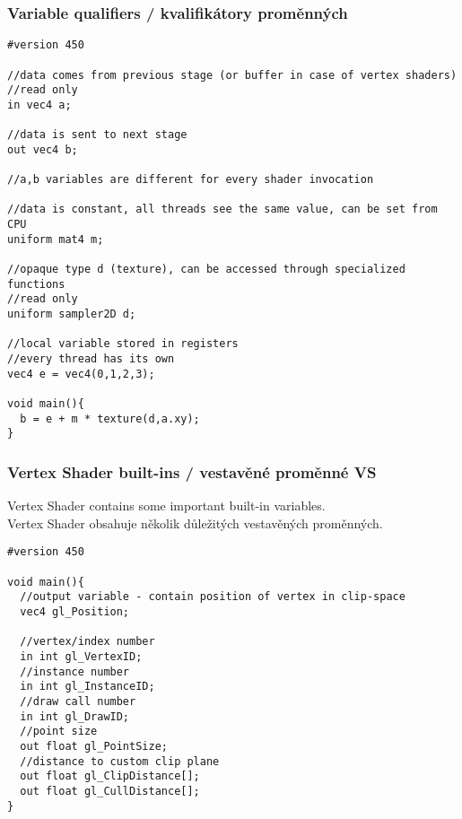 \begin{frame}[fragile]\frametitle{Variable qualifiers / kvalifikátory proměnných}\tiny
\begin{verbatim}
#version 450

//data comes from previous stage (or buffer in case of vertex shaders)
//read only
in vec4 a;

//data is sent to next stage
out vec4 b;

//a,b variables are different for every shader invocation

//data is constant, all threads see the same value, can be set from CPU
uniform mat4 m;

//opaque type d (texture), can be accessed through specialized functions
//read only
uniform sampler2D d;

//local variable stored in registers 
//every thread has its own
vec4 e = vec4(0,1,2,3);

void main(){
  b = e + m * texture(d,a.xy);
}
\end{verbatim}
\end{frame}

\begin{frame}[fragile]\frametitle{Vertex Shader built-ins / vestavěné proměnné VS}
Vertex Shader contains some important built-in variables.\\
Vertex Shader obsahuje několik důležitých vestavěných proměnných.
{\scriptsize
\begin{verbatim}
#version 450

void main(){
  //output variable - contain position of vertex in clip-space
  vec4 gl_Position;

  //vertex/index number
  in int gl_VertexID;
  //instance number
  in int gl_InstanceID;
  //draw call number
  in int gl_DrawID;
  //point size
  out float gl_PointSize;
  //distance to custom clip plane
  out float gl_ClipDistance[];
  out float gl_CullDistance[];
}

\end{verbatim}
}
\end{frame}

